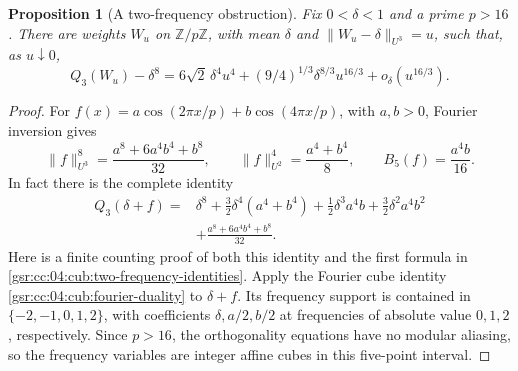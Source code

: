\documentclass[11pt,letterpaper]{article}
\numberwithin{equation}{section}
\newtheorem{proposition}[theorem]{Proposition}
\theoremstyle{definition}
\theoremstyle{remark}
\newcommand{\1}{\mathbf 1}
\begin{document}
\begin{proposition}[A two-frequency obstruction]
\label{gsr:cc:04:cub:two-frequency}
Fix $0<\delta<1$ and a prime $p>16$. There are weights $W_u$ on
$\mathbb Z/p\mathbb Z$, with mean $\delta$ and
$\|W_u-\delta\|_{U^3}=u$, such that, as $u\downarrow0$,
\begin{equation}
 Q_3(W_u)-\delta^8
 =6\sqrt2\,\delta^4u^4
   +(9/4)^{1/3}\delta^{8/3}u^{16/3}+o_\delta(u^{16/3}).
 \label{gsr:cc:04:cub:two-frequency-asymptotic}
\end{equation}
\end{proposition}

\begin{proof}
For $f(x)=a\cos(2\pi x/p)+b\cos(4\pi x/p)$, with $a,b>0$, Fourier
inversion gives
\begin{equation}
 \|f\|_{U^3}^8=\frac{a^8+6a^4b^4+b^8}{32},\qquad
 \|f\|_{U^2}^4=\frac{a^4+b^4}{8},\qquad
 B_5(f)=\frac{a^4b}{16}.
 \label{gsr:cc:04:cub:two-frequency-identities}
\end{equation}
In fact there is the complete identity
\begin{align}
 Q_3(\delta+f)
 ={}&\delta^8+\tfrac32\delta^4(a^4+b^4)
            +\tfrac12\delta^3a^4b+\tfrac32\delta^2a^4b^2
             \nonumber\\
    &+\frac{a^8+6a^4b^4+b^8}{32}.
 \label{gsr:cc:04:cub:two-frequency-complete}
\end{align}
Here is a finite counting proof of both this identity and the first formula
in \eqref{gsr:cc:04:cub:two-frequency-identities}. Apply the Fourier cube identity
\eqref{gsr:cc:04:cub:fourier-duality} to $\delta+f$. Its frequency support is contained
in $\{-2,-1,0,1,2\}$, with coefficients $\delta,a/2,b/2$ at frequencies
of absolute value $0,1,2$, respectively. Since $p>16$, the orthogonality
equations have no modular aliasing, so the frequency variables are integer
affine cubes in this five-point interval.


\end{proof}
\end{document}
